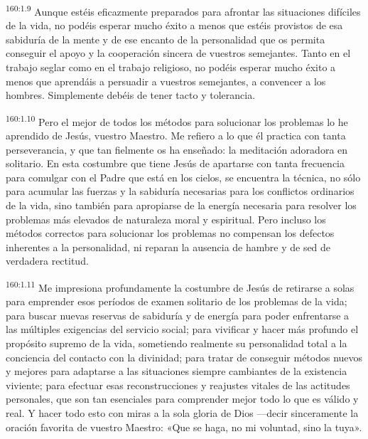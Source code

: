 \par 
\textsuperscript{160:1.9} Aunque estéis eficazmente preparados para afrontar las situaciones difíciles de la vida, no podéis esperar mucho éxito a menos que estéis provistos de esa sabiduría de la mente y de ese encanto de la personalidad que os permita conseguir el apoyo y la cooperación sincera de vuestros semejantes. Tanto en el trabajo seglar como en el trabajo religioso, no podéis esperar mucho éxito a menos que aprendáis a persuadir a vuestros semejantes, a convencer a los hombres. Simplemente debéis de tener tacto y tolerancia.

\par 
\textsuperscript{160:1.10} Pero el mejor de todos los métodos para solucionar los problemas lo he aprendido de Jesús, vuestro Maestro. Me refiero a lo que él practica con tanta perseverancia, y que tan fielmente os ha enseñado: la meditación adoradora en solitario. En esta costumbre que tiene Jesús de apartarse con tanta frecuencia para comulgar con el Padre que está en los cielos, se encuentra la técnica, no sólo para acumular las fuerzas y la sabiduría necesarias para los conflictos ordinarios de la vida, sino también para apropiarse de la energía necesaria para resolver los problemas más elevados de naturaleza moral y espiritual. Pero incluso los métodos correctos para solucionar los problemas no compensan los defectos inherentes a la personalidad, ni reparan la ausencia de hambre y de sed de verdadera rectitud.

\par 
\textsuperscript{160:1.11} Me impresiona profundamente la costumbre de Jesús de retirarse a solas para emprender esos períodos de examen solitario de los problemas de la vida; para buscar nuevas reservas de sabiduría y de energía para poder enfrentarse a las múltiples exigencias del servicio social; para vivificar y hacer más profundo el propósito supremo de la vida, sometiendo realmente su personalidad total a la conciencia del contacto con la divinidad; para tratar de conseguir métodos nuevos y mejores para adaptarse a las situaciones siempre cambiantes de la existencia viviente; para efectuar esas reconstrucciones y reajustes vitales de las actitudes personales, que son tan esenciales para comprender mejor todo lo que es válido y real. Y hacer todo esto con miras a la sola gloria de Dios ---decir sinceramente la oración favorita de vuestro Maestro: «Que se haga, no mi voluntad, sino la tuya».

